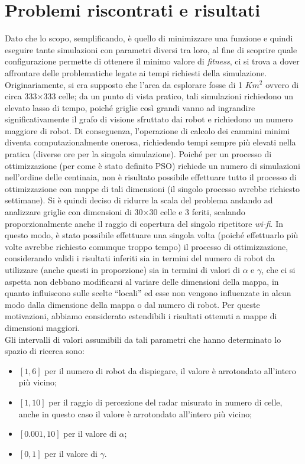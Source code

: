\section{Problemi riscontrati e risultati}
\label{sec:psoResults}
Dato che lo scopo, semplificando, è quello di minimizzare una funzione e quindi eseguire tante simulazioni con parametri diversi tra loro, al fine di scoprire quale configurazione permette di ottenere il minimo valore di \textit{fitness}, ci si trova a dover affrontare delle problematiche legate ai tempi richiesti della simulazione.
Originariamente, si era supposto che l'area da esplorare fosse di 1 $Km^2$ ovvero di circa 333$\times$333 celle; da un punto di vista pratico, tali simulazioni richiedono un elevato lasso di tempo, poiché griglie così grandi vanno ad ingrandire significativamente il grafo di visione sfruttato dai robot e richiedono un numero maggiore di robot.
Di conseguenza, l'operazione di calcolo dei cammini minimi diventa computazionalmente onerosa, richiedendo tempi sempre più elevati nella pratica (diverse ore per la singola simulazione).
Poiché per un processo di ottimizzazione (per come è stato definito PSO) richiede un numero di simulazioni nell'ordine delle centinaia, non è risultato possibile effettuare tutto il processo di ottimizzazione con mappe di tali dimensioni (il singolo processo avrebbe richiesto settimane).
Si è quindi deciso di ridurre la scala del problema andando ad analizzare griglie con dimensioni di 30$\times$30 celle e 3 feriti, scalando proporzionalmente anche il raggio di copertura del singolo ripetitore \textit{wi-fi}.
In questo modo, è stato possibile effettuare una singola volta (poiché effettuarlo più volte avrebbe richiesto comunque troppo tempo) il processo di ottimizzazione, considerando validi i risultati inferiti sia in termini del numero di robot da utilizzare (anche questi in proporzione) sia in termini di valori di $\alpha$ e $\gamma$, che ci si aspetta non debbano modificarsi al variare delle dimensioni della mappa, in quanto influiscono sulle scelte “locali” ed esse non vengono influenzate in alcun modo dalla dimensione della mappa o dal numero di robot.
Per queste motivazioni, abbiamo considerato estendibili i risultati ottenuti a mappe di dimensioni maggiori.\\
Gli intervalli di valori assumibili da tali parametri che hanno determinato lo spazio di ricerca sono:
\begin{itemize}
	\item $\left[1, 6\right]$ per il numero di robot da dispiegare, il valore è arrotondato all'intero più vicino;
	\item $\left[1, 10\right]$ per il raggio di percezione del radar misurato in numero di celle, anche in questo caso il valore è arrotondato all'intero più vicino;
	\item $\left[0.001, 10\right]$ per il valore di $\alpha$;
	\item $\left[0, 1\right]$ per il valore di $\gamma$.
\end{itemize}
